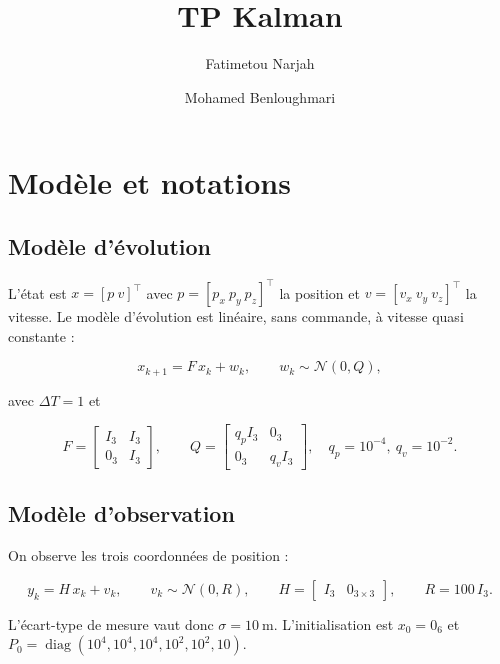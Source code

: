 \documentclass[11pt]{article}
\title{TP Kalman}
\author{
  Fatimetou Narjah \and Mohamed Benloughmari
}
\date{}
\theoremstyle{remark}
\theoremstyle{definition}
\begin{document}
\maketitle

\section{Mod\`ele et notations}\label{sec:modele}

\subsection{Mod\`ele d'\'evolution}

L'\'etat est $x = [p\ v]^\top$ avec $p = [p_x\ p_y\ p_z]^\top$ la position et
$v = [v_x\ v_y\ v_z]^\top$ la vitesse. Le mod\`ele d'\'evolution est lin\'eaire, sans commande, \`a
vitesse quasi constante :

\begin{equation}
x_{k+1} = F\, x_k + w_k,
\qquad
w_k \sim \mathcal{N}(0, Q),
\label{eq:evolution}
\end{equation}

avec $\Delta T = 1$ et

\begin{equation}
F =
\begin{bmatrix}
I_3 & I_3 \\[2pt]
0_3 & I_3
\end{bmatrix},
\qquad
Q =
\begin{bmatrix}
q_p I_3 & 0_3 \\[2pt]
0_3 & q_v I_3
\end{bmatrix},
\quad q_p = 10^{-4},\ q_v = 10^{-2}.
\label{eq:FQ}
\end{equation}

\subsection{Mod\`ele d'observation}

On observe les trois coordonn\'ees de position :

\begin{equation}
y_k = H\, x_k + v_k,
\qquad
v_k \sim \mathcal{N}(0, R),
\qquad
H = \begin{bmatrix} I_3 & 0_{3\times 3} \end{bmatrix},
\qquad
R = 100\, I_3 .
\label{eq:obs}
\end{equation}

L'\'ecart-type de mesure vaut donc $\sigma = 10\ \text{m}$. L'initialisation est
$x_0 = 0_6$ et $P_0 = \operatorname{diag}(10^4, 10^4, 10^4, 10^2, 10^2, 10)$.
\end{document}
